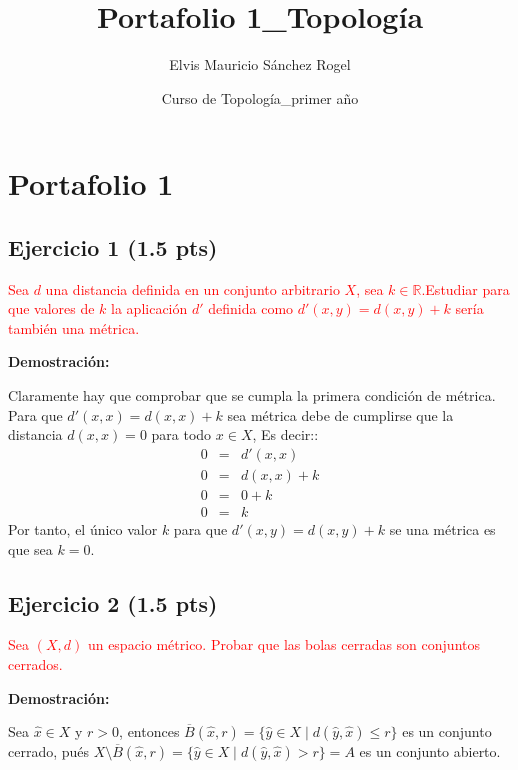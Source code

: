 \documentclass[
]{article}
\title{Portafolio 1\_Topología}
\author{Elvis Mauricio Sánchez Rogel}
\date{Curso de Topología\_primer año}
\begin{document}
\maketitle

{
\hypersetup{linkcolor=blue}
\setcounter{tocdepth}{2}
\tableofcontents
}
\hypertarget{portafolio-1}{%
\section{Portafolio 1}\label{portafolio-1}}

\hypertarget{ejercicio-1-1.5-pts}{%
\subsection{Ejercicio 1 (1.5 pts)}\label{ejercicio-1-1.5-pts}}

\textcolor{red}{Sea $d$ una distancia definida en un conjunto arbitrario $X$, sea $k \in \mathbb{R}$.Estudiar para que valores de $k$ la aplicación $d'$ definida como $d'(x,y)=d(x,y)+k$ sería también una métrica.}

\textbf{Demostración:}

Claramente hay que comprobar que se cumpla la primera condición de
métrica. Para que \(d'(x,x)=d(x,x)+k\) sea métrica debe de cumplirse que
la distancia \(d(x,x)=0\) para todo \(x \in X\), Es decir::
\begin{eqnarray*}
  0 & = & d'(x,x) \\
  0 & = & d(x,x)+k  \\
  0 & = & 0 + k \\
  0 & = & k 
\end{eqnarray*} Por tanto, el único valor \(k\) para que
\(d'(x,y) =d(x,y)+k\) se una métrica es que sea \(k=0\).

\hypertarget{ejercicio-2-1.5-pts}{%
\subsection{Ejercicio 2 (1.5 pts)}\label{ejercicio-2-1.5-pts}}

\textcolor{red}{ Sea $(X,d)$ un espacio métrico. Probar que las bolas cerradas son conjuntos cerrados.}

\textbf{Demostración:}

Sea \(\hat{x} \in X\) y \(r>0\), entonces
\(\overline{B}(\hat{x},r)=\{ \hat{y} \in X \mid d(\hat{y},\hat{x}) \leq r\}\)
es un conjunto cerrado, pués
\(X \setminus \overline B(\hat{x},r) = \{ \hat{y} \in X \mid d(\hat{y},\hat{x}) > r\}= A\)
es un conjunto abierto.
\end{document}
